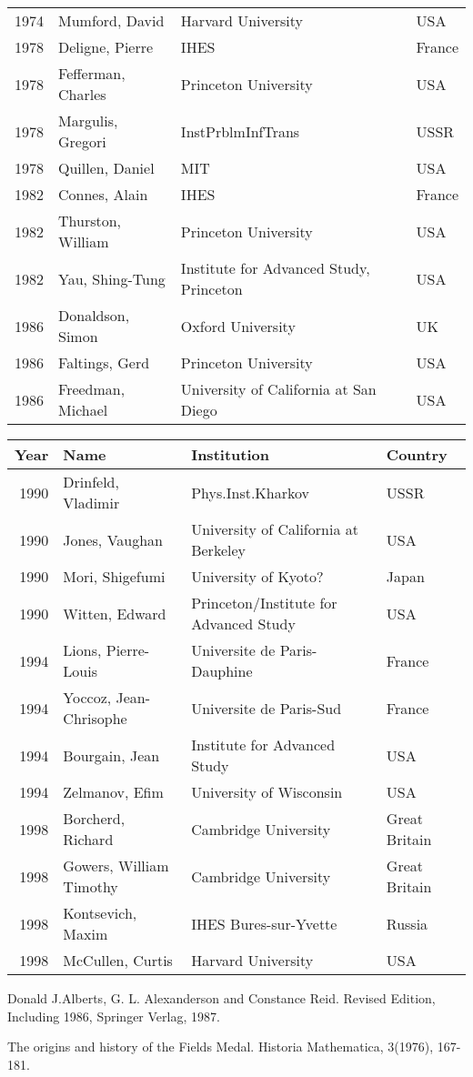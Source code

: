 \begin{tabular}{|r|l|l|l|}
1974&Mumford, David    &Harvard University        &USA \\
1978&Deligne, Pierre   &IHES             &France \\
1978&Fefferman, Charles&Princeton University      &USA \\
1978&Margulis, Gregori &InstPrblmInfTrans&USSR \\
1978&Quillen, Daniel   &MIT              &USA \\
1982&Connes, Alain     &IHES             &France \\
1982&Thurston, William &Princeton University      &USA \\
1982&Yau, Shing-Tung   &Institute for Advanced Study, Princeton              &USA \\
1986&Donaldson, Simon  &Oxford University         &UK \\
1986&Faltings, Gerd    &Princeton University      &USA \\
1986&Freedman, Michael &University of California at San Diego     &USA \\
\hline
\end{tabular}

\begin{tabular}{|r|l|l|l|} \hline

{Year} & {Name} & {Institution} &{Country}
 \\ \hline

1990&Drinfeld, Vladimir&Phys.Inst.Kharkov&USSR \\
1990&Jones, Vaughan    &University of California at Berkeley      &USA \\
1990&Mori, Shigefumi   &University of Kyoto?      &Japan \\
1990&Witten, Edward    &Princeton/Institute for Advanced Study&USA \\
1994& Lions, Pierre-Louis &Universite de Paris-Dauphine&France\\
  1994& Yoccoz, Jean-Chrisophe       &Universite de Paris-Sud&France\\
  1994& Bourgain, Jean               &Institute for Advanced Study&USA\\
  1994&  Zelmanov, Efim               &University of Wisconsin&USA\\
1998&  Borcherd, Richard         &Cambridge University&Great Britain \\
  1998& Gowers, William Timothy     &Cambridge University&Great Britain\\
  1998& Kontsevich, Maxim           &IHES Bures-sur-Yvette&Russia\\
  1998& McCullen, Curtis&Harvard University&USA\\
\hline
\end{tabular}


\bigskip
\bigskip


\Ref

     {Donald J.Alberts, G. L. Alexanderson and Constance Reid.}
     {Revised Edition, Including 1986,  Springer Verlag, 1987.}

        {The origins and history of the Fields Medal.}
        {Historia Mathematica,} {3(1976), 167-181.}
